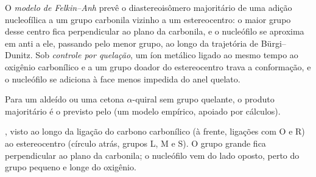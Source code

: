 \begin{definition}\label{def:b3:asymmetric-synthesis:felkin}
O \emph{modelo de Felkin--Anh} prevê o diastereoisômero
majoritário de uma adição nucleofílica a um grupo carbonila vizinho a um
estereocentro: o maior grupo desse centro fica perpendicular ao
plano da carbonila, e o nucleófilo se aproxima em anti a ele, passando pelo menor
grupo, ao longo da trajetória de Bürgi--Dunitz. Sob \emph{controle por
quelação}, um íon metálico ligado ao mesmo tempo ao oxigênio carbonílico
e a um grupo doador do estereocentro trava a conformação, e o
nucleófilo se adiciona à face menos impedida do anel quelato.
\end{definition}

\begin{proposition}\label{prop:b3:asymmetric-synthesis:felkin}
Para um aldeído ou uma cetona $\alpha$-quiral sem grupo quelante, o produto
majoritário é o previsto pelo  (um modelo empírico,
apoiado por cálculos). \admitted
\end{proposition}

\begin{omfigure}

{\small {}, visto ao longo da ligação do carbono carbonílico (à frente,
ligações com O e R) ao estereocentro (círculo atrás, grupos L, M e S). O
grupo grande fica perpendicular ao plano da carbonila; o nucleófilo vem do
lado oposto, perto do grupo pequeno e longe do oxigênio.}
\end{omfigure}

